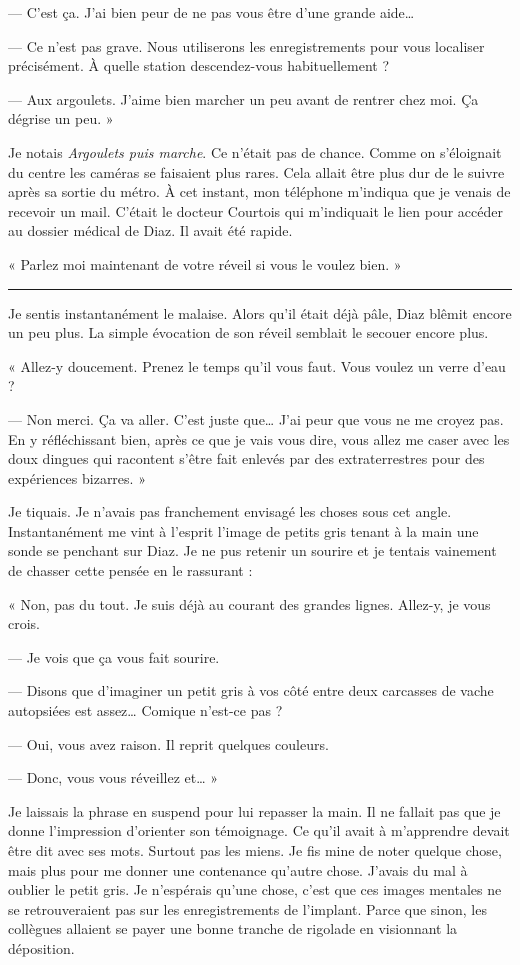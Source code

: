— C'est ça. J'ai bien peur de ne pas vous être d'une grande aide…

— Ce n'est pas grave. Nous utiliserons les enregistrements pour vous localiser précisément. À quelle station
descendez-vous habituellement ?

— Aux argoulets. J'aime bien marcher un peu avant de rentrer chez moi. Ça dégrise un peu. »

Je notais \emph{Argoulets puis marche}. Ce n'était pas de chance. Comme on s'éloignait du centre les caméras se
faisaient plus rares. Cela allait être plus dur de le suivre après sa sortie du métro. À cet instant, mon téléphone
m'indiqua que je venais de recevoir un mail. C'était le docteur Courtois qui m'indiquait le lien pour accéder au dossier
médical de Diaz. Il avait été rapide.

« Parlez moi maintenant de votre réveil si vous le voulez bien. »

\fancybreak{* * *}

Je sentis instantanément le malaise. Alors qu'il était déjà pâle, Diaz blêmit encore un peu plus.
La simple évocation de son réveil semblait le secouer encore plus.

« Allez-y doucement. Prenez le temps qu'il vous faut. Vous voulez un verre d'eau ?

— Non merci. Ça va aller. C'est juste que… J'ai peur que vous ne me croyez pas. En y réfléchissant bien, après ce que
je vais vous dire, vous allez me caser avec les doux dingues qui racontent s'être fait enlevés par des extraterrestres
pour des expériences bizarres. »

Je tiquais. Je n'avais pas franchement envisagé les choses sous cet angle. Instantanément me vint à l'esprit l'image de
petits gris tenant à la main une sonde se penchant sur Diaz. Je ne pus retenir un sourire et je tentais vainement de
chasser cette pensée en le rassurant :

« Non, pas du tout. Je suis déjà au courant des grandes lignes. Allez-y, je vous crois.

— Je vois que ça vous fait sourire.

— Disons que d'imaginer un petit gris à vos côté entre deux carcasses de vache autopsiées est assez… Comique n'est-ce
pas ?

— Oui, vous avez raison. Il reprit quelques couleurs.

— Donc, vous vous réveillez et… »

Je laissais la phrase en suspend pour lui repasser la main. Il ne fallait pas que je donne l'impression d'orienter son
témoignage. Ce qu'il avait à m'apprendre devait être dit avec ses mots. Surtout pas les miens. Je fis mine de noter
quelque chose, mais plus pour me donner une contenance qu'autre chose. J'avais du mal à oublier le petit gris. Je
n'espérais qu'une chose, c'est que ces images mentales ne se retrouveraient pas sur les enregistrements de l'implant.
Parce que sinon, les collègues allaient se payer une bonne tranche de rigolade en visionnant la déposition.

